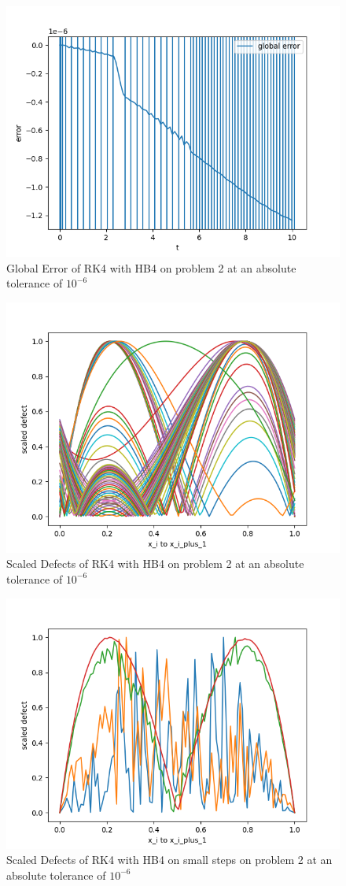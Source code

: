 \documentclass{article}
\begin{document}
\begin{figure}[H]
\centering
\includegraphics[width=0.7\linewidth]{./figures/rk4_with_hb4_p2_global_error}
\caption{Global Error of RK4 with HB4 on problem 2 at an absolute tolerance of $10^{-6}$}
\label{fig:rk4_with_hb4_p2_global_error}
\end{figure}

\begin{figure}[H]
\centering
\includegraphics[width=0.7\linewidth]{./figures/rk4_with_hb4_p2_scaled_defects}
\caption{Scaled Defects of RK4 with HB4 on problem 2 at an absolute tolerance of $10^{-6}$}
\label{fig:rk4_with_hb4_p2_scaled_defects}
\end{figure}

\begin{figure}[H]
\centering
\includegraphics[width=0.7\linewidth]{./figures/rk4_with_hb4_p2_scaled_defects_small_steps}
\caption{Scaled Defects of RK4 with HB4 on small steps on problem 2 at an absolute tolerance of $10^{-6}$}
\label{fig:rk4_with_hb4_p2_scaled_defects_small_steps}
\end{figure}
\end{document}
